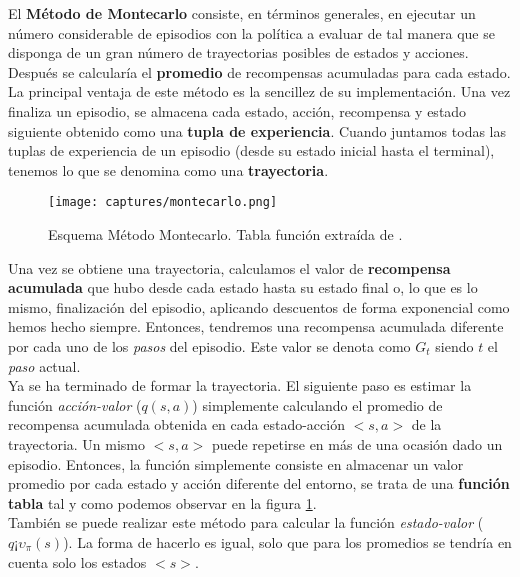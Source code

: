\documentclass[11pt,fleqn]{book} %
\begin{document}
El \textbf{Método de Montecarlo} \cite{book:miguel} \cite{article:RLromero} consiste, en términos generales, en ejecutar un número considerable de episodios con la política a evaluar de tal manera que se disponga de un gran número de trayectorias posibles de estados y acciones. Después se calcularía el \textbf{promedio} de recompensas acumuladas para cada estado. \\

La principal ventaja de este método es la sencillez de su implementación. Una vez finaliza un episodio, se almacena cada estado, acción, recompensa y estado siguiente obtenido como una \textbf{tupla de experiencia}. Cuando juntamos todas las tuplas de experiencia de un episodio (desde su estado inicial hasta el terminal), tenemos lo que se denomina como una \textbf{trayectoria}. \\

\newpage

\begin{figure}[H]
	\centering\texttt{[image: captures/montecarlo.png]}
	\caption{Esquema Método Montecarlo. Tabla función extraída de \cite{article:RLromero}.}
	\label{fig:montecarlo} %
\end{figure}

Una vez se obtiene una trayectoria, calculamos el valor de \textbf{recompensa acumulada} que hubo desde cada estado hasta su estado final o, lo que es lo mismo, finalización del episodio, aplicando descuentos de forma exponencial como hemos hecho siempre. Entonces, tendremos una recompensa acumulada diferente por cada uno de los \textit{pasos} del episodio. Este valor se denota como $G_{t}$ siendo $t$ el \textit{paso} actual. \\

Ya se ha terminado de formar la trayectoria. El siguiente paso es estimar la función \textit{acción-valor} ($q(s,a)$) simplemente calculando el promedio de recompensa acumulada obtenida en cada estado-acción $<s,a>$ de la trayectoria. Un mismo $<s,a>$ puede repetirse en más de una ocasión dado un episodio. Entonces, la función simplemente consiste en almacenar un valor promedio por cada estado y acción diferente del entorno, se trata de una \textbf{función tabla} tal y como podemos observar en la figura \ref{fig:montecarlo}.\\

También se puede realizar este método para calcular la función \textit{estado-valor} ($q¡\upsilon_\pi(s)$). La forma de hacerlo es igual, solo que para los promedios se tendría en cuenta solo los estados $<s>$.
\end{document}
